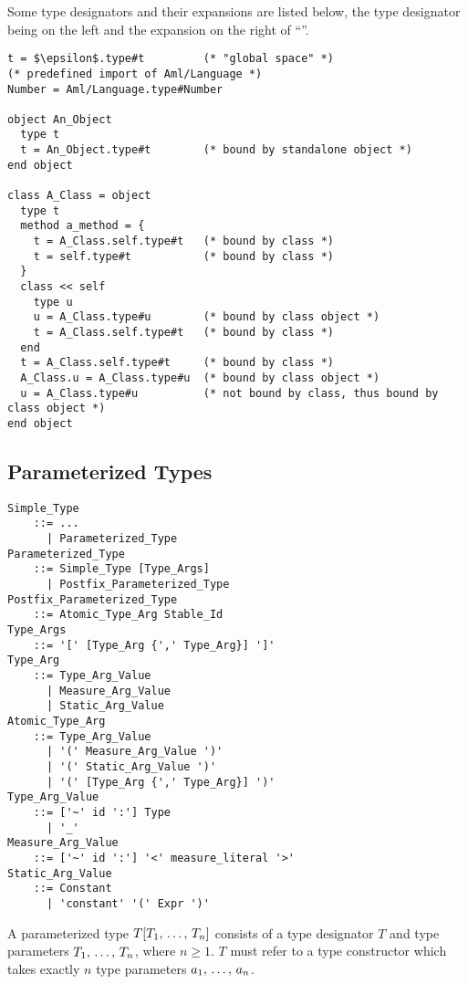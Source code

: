 \example Some type designators and their expansions are listed below, the type designator being on the left and the expansion on the right of ``\code{=}''. 
\begin{lstlisting}
t = $\epsilon$.type#t         (* "global space" *)
(* predefined import of Aml/Language *)
Number = Aml/Language.type#Number 

object An_Object
  type t
  t = An_Object.type#t        (* bound by standalone object *)
end object

class A_Class = object
  type t
  method a_method = {
    t = A_Class.self.type#t   (* bound by class *)
    t = self.type#t           (* bound by class *)
  }
  class << self
    type u
    u = A_Class.type#u        (* bound by class object *)
    t = A_Class.self.type#t   (* bound by class *)
  end
  t = A_Class.self.type#t     (* bound by class *)
  A_Class.u = A_Class.type#u  (* bound by class object *)
  u = A_Class.type#u          (* not bound by class, thus bound by class object *)
end object
\end{lstlisting}





\subsection{Parameterized Types}
\label{sec:parameterized-types}

\grammar\begin{lstlisting}
Simple_Type
    ::= ...
      | Parameterized_Type
Parameterized_Type
    ::= Simple_Type [Type_Args]
      | Postfix_Parameterized_Type
Postfix_Parameterized_Type 
    ::= Atomic_Type_Arg Stable_Id
Type_Args 
    ::= '[' [Type_Arg {',' Type_Arg}] ']'
Type_Arg 
    ::= Type_Arg_Value
      | Measure_Arg_Value
      | Static_Arg_Value
Atomic_Type_Arg
    ::= Type_Arg_Value
      | '(' Measure_Arg_Value ')'
      | '(' Static_Arg_Value ')'
      | '(' [Type_Arg {',' Type_Arg}] ')'
Type_Arg_Value
    ::= ['~' id ':'] Type
      | '_'
Measure_Arg_Value 
    ::= ['~' id ':'] '<' measure_literal '>'
Static_Arg_Value
    ::= Constant
      | 'constant' '(' Expr ')'
\end{lstlisting}

A parameterized type $T[T_1 ,\, \ldots ,\, T_n]$ consists of a type designator $T$ and type parameters $T_1 ,\, \ldots ,\, T_n$, where $n \geq 1$. $T$ must refer to a type constructor which takes exactly $n$ type parameters $a_1 ,\, \ldots ,\, a_n$. 

